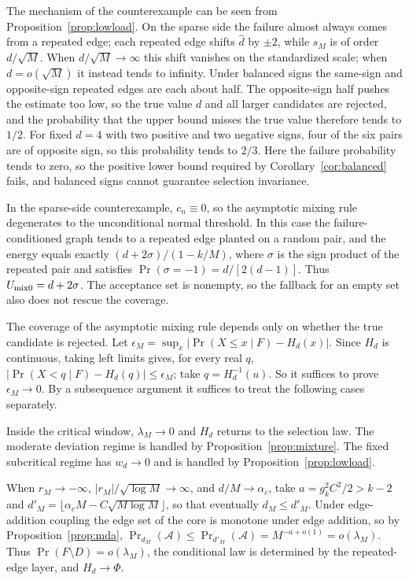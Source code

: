The mechanism of the counterexample can be seen from Proposition~\ref{prop:lowload}. On the sparse
side the failure almost always comes from a repeated edge; each repeated edge shifts
$\widehat d$ by $\pm2$, while $s_M$ is of order $d/\sqrt M$. When $d/\sqrt M\to\infty$ this shift
vanishes on the standardized scale; when $d=o(\sqrt M)$ it instead tends to infinity. Under
balanced signs the same-sign and opposite-sign repeated edges are each about half. The
opposite-sign half pushes the estimate too low, so the true value $d$ and all larger candidates
are rejected, and the probability that the upper bound misses the true value therefore tends to
$1/2$. For fixed $d=4$ with two positive and two negative signs, four of the six pairs are of
opposite sign, so this probability tends to $2/3$. Here the failure probability tends to zero, so
the positive lower bound required by Corollary~\ref{cor:balanced} fails, and balanced signs cannot
guarantee selection invariance.

In the sparse-side counterexample, $c_n\equiv0$, so the asymptotic mixing rule degenerates to the
unconditional normal threshold. In this case the failure-conditioned graph tends to a repeated
edge planted on a random pair, and the energy equals exactly $(d+2\sigma)/(1-k/M)$, where
$\sigma$ is the sign product of the repeated pair and satisfies
$\Pr(\sigma=-1)=d/[2(d-1)]$. Thus $U_{\rm mix0}=d+2\sigma$. The acceptance set is nonempty, so
the fallback for an empty set also does not rescue the coverage.

The coverage of the asymptotic mixing rule depends only on whether the true candidate is rejected.
Let $\epsilon_M=\sup_x|\Pr(X\le x\mid F)-H_d(x)|$. Since $H_d$ is continuous, taking left limits
gives, for every real $q$, $|\Pr(X<q\mid F)-H_d(q)|\le\epsilon_M$; take $q=H_d^{-1}(u)$. So it
suffices to prove $\epsilon_M\to0$. By a subsequence argument it suffices to treat the following
cases separately.

Inside the critical window, $\lambda_M\to0$ and $H_d$ returns to the selection law. The moderate
deviation regime is handled by Proposition~\ref{prop:mixture}. The fixed subcritical regime has
$w_d\to0$ and is handled by Proposition~\ref{prop:lowload}.

When $r_M\to-\infty$, $|r_M|/\sqrt{\log M}\to\infty$, and $d/M\to\alpha_c$, take
$a=g_k^2C^2/2>k-2$ and $d'_M=\lfloor\alpha_cM-C\sqrt{M\log M}\rfloor$, so that eventually
$d_M\le d'_M$. Under edge-addition coupling the edge set of the core is monotone under edge
addition, so by Proposition~\ref{prop:mda},
$\Pr_{d_M}(\mathcal A)\le\Pr_{d'_M}(\mathcal A)=M^{-a+o(1)}=o(\lambda_M)$. Thus
$\Pr(F\setminus D)=o(\lambda_M)$, the conditional law is determined by the repeated-edge layer,
and $H_d\to\Phi$.

